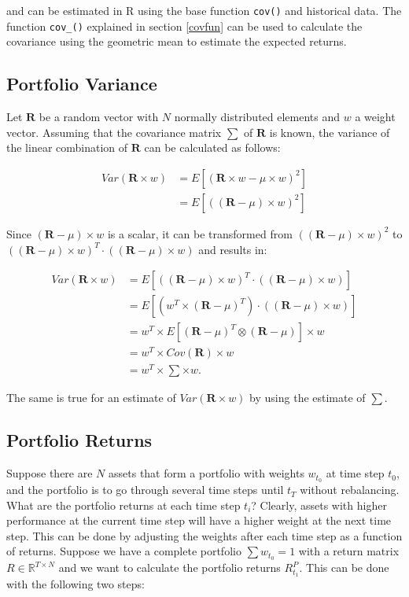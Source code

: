 \documentclass[
  oneside, a4paper, 12pt, openany]{book}
\theoremstyle{definition}
\theoremstyle{definition}
\theoremstyle{definition}
\theoremstyle{definition}
\theoremstyle{remark}
\begin{document}
and can be estimated in R using the base function \texttt{cov()} and historical data. The function \texttt{cov\_()} explained in section \ref{covfun} can be used to calculate the covariance using the geometric mean to estimate the expected returns.

\hypertarget{portvar}{%
\subsection{Portfolio Variance}\label{portvar}}

Let \(\pmb{R}\) be a random vector with \(N\) normally distributed elements and \(w\) a weight vector. Assuming that the covariance matrix \(\sum\) of \(\pmb{R}\) is known, the variance of the linear combination of \(\pmb{R}\) can be calculated as follows:

\begin{align*}
  Var(\pmb{R} \times w) &= E[(\pmb{R} \times w - \mu \times w)^2] \\
  &= E[((\pmb{R} - \mu) \times w)^2]
\end{align*}

Since \((\pmb{R} - \mu) \times w\) is a scalar, it can be transformed from \(((\pmb{R} - \mu) \times w)^2\) to \mbox{$((\pmb{R} - \mu) \times w)^T \cdot ((\pmb{R} - \mu) \times w)$} and results in:

\begin{align*}
  Var(\pmb{R} \times w) &= E[((\pmb{R} - \mu) \times w)^T \cdot ((\pmb{R} - \mu) \times w)]\\ 
  &= E[(w^T \times (\pmb{R} - \mu)^T) \cdot ((\pmb{R} - \mu) \times w)]\\ 
  &= w^T \times E[(\pmb{R} - \mu)^T \otimes (\pmb{R} - \mu)] \times w \\
  &= w^T \times Cov(\pmb{R}) \times w \\
  &= w^T \times \textstyle\sum \times w.
\end{align*}

The same is true for an estimate of \(Var(\pmb{R} \times w)\) by using the estimate of \(\textstyle\sum\).

\hypertarget{portfolioreturns}{%
\subsection{Portfolio Returns}\label{portfolioreturns}}

Suppose there are \(N\) assets that form a portfolio with weights \(w_{t_0}\) at time step \(t_0\), and the portfolio is to go through several time steps until \(t_T\) without rebalancing. What are the portfolio returns at each time step \(t_i\)? Clearly, assets with higher performance at the current time step will have a higher weight at the next time step. This can be done by adjusting the weights after each time step as a function of returns. Suppose we have a complete portfolio \(\textstyle\sum w_{t_0} = 1\) with a return matrix \(R \in \mathbb{R}^{T \times N}\) and we want to calculate the portfolio returns \(R_{t_1}^P\). This can be done with the following two steps:
\end{document}
